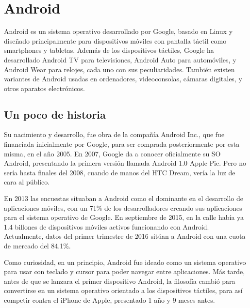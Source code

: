 \documentclass[
10pt, %
a4paper, %
oneside, %
headinclude,footinclude, %
BCOR5mm, %
]{scrartcl}
\begin{document}
\section{Android}
Android es un sistema operativo desarrollado por Google, basado en Linux y diseñado principalmente para dispositivos móviles con pantalla táctil como smartphones y tabletas. Además de los dispositivos táctiles, Google ha desarrollado Android TV para televisiones, Android Auto para automóviles, y Android Wear para relojes, cada uno con sus peculiaridades. También existen variantes de Android usadas en ordenadores, videoconsolas, cámaras digitales, y otros aparatos electrónicos.

\subsection{Un poco de historia}
Su nacimiento y desarrollo, fue obra de la compañía Android Inc., que fue financiada inicialmente por Google, para ser comprada posteriormente por esta misma, en el año 2005. En 2007, Google da a conocer oficialmente su SO Android, presentando la primera versión llamada Android 1.0 Apple Pie. Pero no sería hasta finales del 2008, cuando de manos del HTC Dream, vería la luz de cara al público. 

En 2013 las encuestas situaban a Android como el dominante en el desarrollo de aplicaciones móviles, con un 71\% de los desarrolladores creando sus aplicaciones para el sistema operativo de Google. En septiembre de 2015, en la calle había ya 1.4 billones de dispositivos móviles activos funcionando con Android. Actualmente, datos del primer trimestre de 2016 sitúan a Android con una cuota de mercado del 84.1\%.

Como curiosidad, en un principio, Android fue ideado como un sistema operativo para usar con teclado y cursor para poder navegar entre aplicaciones. Más tarde, antes de que se lanzara el primer dispositivo Android, la filosofía cambió para convertirse en un sistema operativo orientado a los dispositivos táctiles, para así competir contra el iPhone de Apple, presentado 1 año y 9 meses antes.
\end{document}
